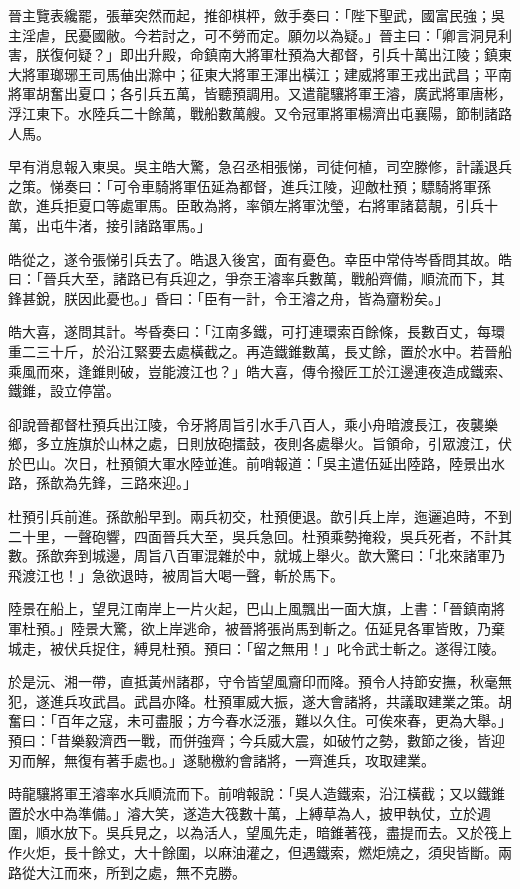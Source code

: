 晉主覽表纔罷，張華突然而起，推卻棋枰，斂手奏曰：「陛下聖武，國富民強；吳主淫虐，民憂國敝。今若討之，可不勞而定。願勿以為疑。」晉主曰：「卿言洞見利害，朕復何疑？」即出升殿，命鎮南大將軍杜預為大都督，引兵十萬出江陵；鎮東大將軍瑯琊王司馬伷出滁中；征東大將軍王渾出橫江；建威將軍王戎出武昌；平南將軍胡奮出夏口；各引兵五萬，皆聽預調用。又遣龍驤將軍王濬，廣武將軍唐彬，浮江東下。水陸兵二十餘萬，戰船數萬艘。又令冠軍將軍楊濟出屯襄陽，節制諸路人馬。

早有消息報入東吳。吳主皓大驚，急召丞相張悌，司徒何植，司空滕修，計議退兵之策。悌奏曰：「可令車騎將軍伍延為都督，進兵江陵，迎敵杜預；驃騎將軍孫歆，進兵拒夏口等處軍馬。臣敢為將，率領左將軍沈瑩，右將軍諸葛靚，引兵十萬，出屯牛渚，接引諸路軍馬。」

皓從之，遂令張悌引兵去了。皓退入後宮，面有憂色。幸臣中常侍岑昏問其故。皓曰：「晉兵大至，諸路已有兵迎之，爭奈王濬率兵數萬，戰船齊備，順流而下，其鋒甚銳，朕因此憂也。」昏曰：「臣有一計，令王濬之舟，皆為齏粉矣。」

皓大喜，遂問其計。岑昏奏曰：「江南多鐵，可打連環索百餘條，長數百丈，每環重二三十斤，於沿江緊要去處橫截之。再造鐵錐數萬，長丈餘，置於水中。若晉船乘風而來，逢錐則破，豈能渡江也？」皓大喜，傳令撥匠工於江邊連夜造成鐵索、鐵錐，設立停當。

卻說晉都督杜預兵出江陵，令牙將周旨引水手八百人，乘小舟暗渡長江，夜襲樂鄉，多立旌旗於山林之處，日則放砲擂鼓，夜則各處舉火。旨領命，引眾渡江，伏於巴山。次日，杜預領大軍水陸並進。前哨報道：「吳主遣伍延出陸路，陸景出水路，孫歆為先鋒，三路來迎。」

杜預引兵前進。孫歆船早到。兩兵初交，杜預便退。歆引兵上岸，迤邐追時，不到二十里，一聲砲響，四面晉兵大至，吳兵急回。杜預乘勢掩殺，吳兵死者，不計其數。孫歆奔到城邊，周旨八百軍混雜於中，就城上舉火。歆大驚曰：「北來諸軍乃飛渡江也！」急欲退時，被周旨大喝一聲，斬於馬下。

陸景在船上，望見江南岸上一片火起，巴山上風飄出一面大旗，上書：「晉鎮南將軍杜預。」陸景大驚，欲上岸逃命，被晉將張尚馬到斬之。伍延見各軍皆敗，乃棄城走，被伏兵捉住，縛見杜預。預曰：「留之無用！」叱令武士斬之。遂得江陵。

於是沅、湘一帶，直抵黃州諸郡，守令皆望風齎印而降。預令人持節安撫，秋毫無犯，遂進兵攻武昌。武昌亦降。杜預軍威大振，遂大會諸將，共議取建業之策。胡奮曰：「百年之寇，未可盡服；方今春水泛漲，難以久住。可俟來春，更為大舉。」預曰：「昔樂毅濟西一戰，而併強齊；今兵威大震，如破竹之勢，數節之後，皆迎刃而解，無復有著手處也。」遂馳檄約會諸將，一齊進兵，攻取建業。

時龍驤將軍王濬率水兵順流而下。前哨報說：「吳人造鐵索，沿江橫截；又以鐵錐置於水中為準備。」濬大笑，遂造大筏數十萬，上縛草為人，披甲執仗，立於週圍，順水放下。吳兵見之，以為活人，望風先走，暗錐著筏，盡提而去。又於筏上作火炬，長十餘丈，大十餘圍，以麻油灌之，但遇鐵索，燃炬燒之，須臾皆斷。兩路從大江而來，所到之處，無不克勝。

